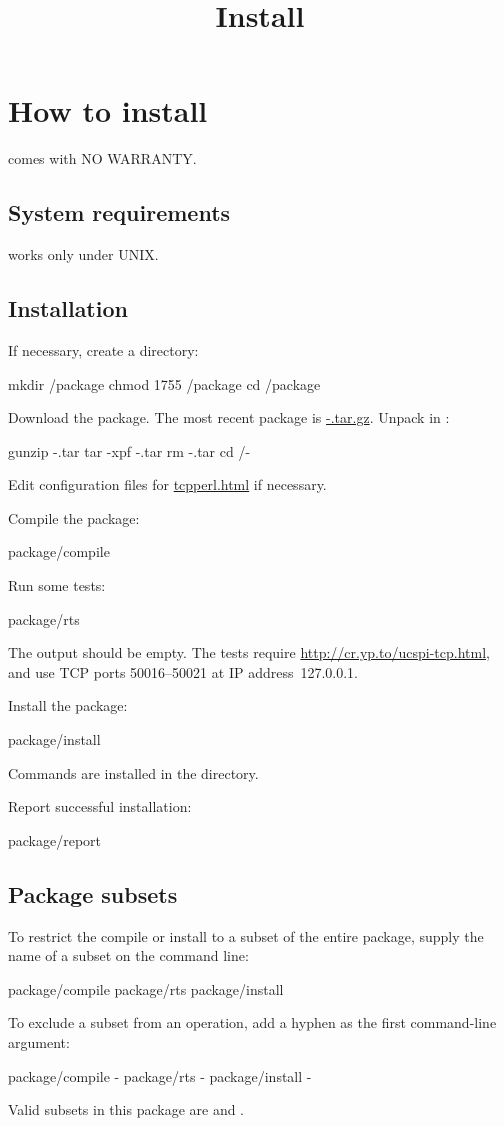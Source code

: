 \documentclass{book}
\title{Install}
\begin{document}
\section{How to install \package}

\package{} comes with NO WARRANTY.

\subsection{System requirements}
\package{} works only under UNIX.

\subsection{Installation}
If necessary, create a  directory:
\begin{code}%
  mkdir /package
  chmod 1755 /package
  cd /package
\end{code}

Download the \package{} package.  The most recent \package{}
package is
\href{\version}{\package-\version.tar.gz}.
Unpack \package{} in :
\begin{code}%
  gunzip \package-\version.tar
  tar -xpf \package-\version.tar
  rm \package-\version.tar
  cd \path/\package-\version
\end{code}

Edit configuration files for \href{\cmd{tcpperl}}{tcpperl.html}
if necessary.

Compile the package:
\begin{code}%
  package/compile
\end{code}

Run some tests:
\begin{code}%
  package/rts
\end{code}
The output should be empty.  The tests require
\href{ucspi-tcp}{http://cr.yp.to/ucspi-tcp.html}, and use TCP ports
50016--50021 at IP address~127.0.0.1.

Install the package:
\begin{code}%
  package/install
\end{code}

Commands are installed in the
 directory.

Report successful installation:
\begin{code}%
  package/report
\end{code}

\subsection{Package subsets}
To restrict the compile or install to a subset of the entire package,
supply the name of a subset on the command line:
\begin{code}%
  package/compile 
  package/rts 
  package/install 
\end{code}

To exclude a subset from an operation, add a hyphen as the first
command-line argument:
\begin{code}%
  package/compile - 
  package/rts - 
  package/install - 
\end{code}

Valid subsets in this package are  and .
\end{document}
